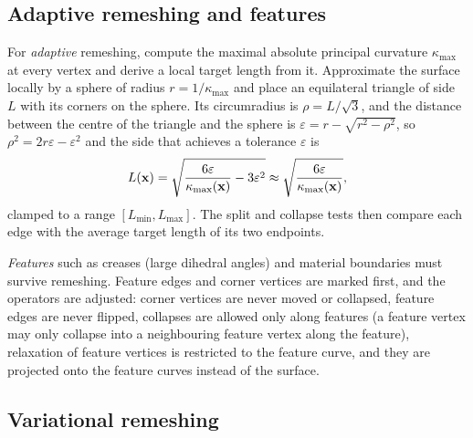 
\subsection{Adaptive remeshing and features}

For \emph{adaptive} remeshing, compute the maximal absolute principal curvature $\kappa_{\max}$ at
every vertex and derive a local target length from it. Approximate the surface locally by a sphere
of radius $r=1/\kappa_{\max}$ and place an equilateral triangle of side $L$ with its corners on the
sphere. Its circumradius is $\rho=L/\sqrt3$, and the distance between the centre of the triangle
and the sphere is $\varepsilon=r-\sqrt{r^2-\rho^2}$, so $\rho^2=2r\varepsilon-\varepsilon^2$ and the
side that achieves a tolerance $\varepsilon$ is
\begin{equation}
L(\mathbf{x})=\sqrt{\frac{6\varepsilon}{\kappa_{\max}(\mathbf{x})}-3\varepsilon^2}\approx\sqrt{\frac{6\varepsilon}{\kappa_{\max}(\mathbf{x})}},
\end{equation}
clamped to a range $[L_{\min},L_{\max}]$. The split and collapse tests then compare each edge with
the average target length of its two endpoints.

\emph{Features} such as creases (large dihedral angles) and material boundaries must survive
remeshing. Feature edges and corner vertices are marked first, and the operators are adjusted:
corner vertices are never moved or collapsed, feature edges are never flipped, collapses are
allowed only along features (a feature vertex may only collapse into a neighbouring feature vertex
along the feature), relaxation of feature vertices is restricted to the feature curve, and they are
projected onto the feature curves instead of the surface.

\subsection{Variational remeshing}

